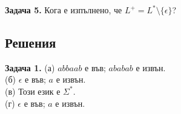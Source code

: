 \documentclass[openany]{book}
\begin{document}
    \vspace{15pt}

    \textbf{Задача 5.} Кога е изпълнено, че $L^+ = L^* \setminus \{\epsilon\}$?

\vspace{25pt}

\subsection{Решения}
    \textbf{Задача 1.} (а) $abbaab$ е във; $ababab$ е извън. \\
    (б) $\epsilon$ е във; $a$ е извън. \\
    (в) Този език е $\Sigma^*$. \\
    (г) $\epsilon$ е във; $a$ е извън.

    \vspace{15pt}
\end{document}
